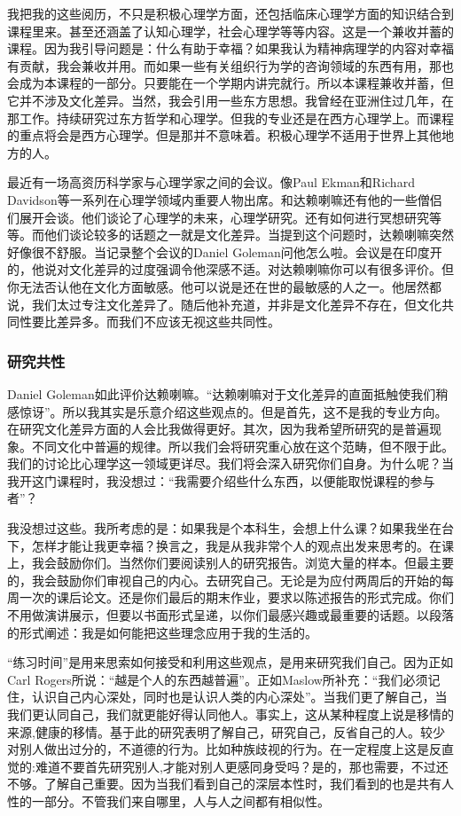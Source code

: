 我把我的这些阅历，不只是积极心理学方面，还包括临床心理学方面的知识结合到课程里来。甚至还涵盖了认知心理学，社会心理学等等内容。这是一个兼收并蓄的课程。因为我引导问题是：什么有助于幸福？如果我认为精神病理学的内容对幸福有贡献，我会兼收并用。而如果一些有关组织行为学的咨询领域的东西有用，那也会成为本课程的一部分。只要能在一个学期内讲完就行。所以本课程兼收并蓄，但它并不涉及文化差异。当然，我会引用一些东方思想。我曾经在亚洲住过几年，在那工作。持续研究过东方哲学和心理学。但我的专业还是在西方心理学上。而课程的重点将会是西方心理学。但是那并不意味着。积极心理学不适用于世界上其他地方的人。

最近有一场高资历科学家与心理学家之间的会议。像Paul Ekman和Richard Davidson等一系列在心理学领域内重要人物出席。和达赖喇嘛还有他的一些僧侣们展开会谈。他们谈论了心理学的未来，心理学研究。还有如何进行冥想研究等等。而他们谈论较多的话题之一就是文化差异。当提到这个问题时，达赖喇嘛突然好像很不舒服。当记录整个会议的Daniel Goleman问他怎么啦。会议是在印度开的，他说对文化差异的过度强调令他深感不适。对达赖喇嘛你可以有很多评价。但你无法否认他在文化方面敏感。他可以说是还在世的最敏感的人之一。他居然都说，我们太过专注文化差异了。随后他补充道，并非是文化差异不存在，但文化共同性要比差异多。而我们不应该无视这些共同性。

\subsubsection{研究共性}
Daniel Goleman如此评价达赖喇嘛。“达赖喇嘛对于文化差异的直面抵触使我们稍感惊讶”。所以我其实是乐意介绍这些观点的。但是首先，这不是我的专业方向。在研究文化差异方面的人会比我做得更好。其次，因为我希望所研究的是普遍现象。不同文化中普遍的规律。所以我们会将研究重心放在这个范畴，但不限于此。我们的讨论比心理学这一领域更详尽。我们将会深入研究你们自身。为什么呢？当我开这门课程时，我没想过：“我需要介绍些什么东西，以便能取悦课程的参与者”？ 

我没想过这些。我所考虑的是：如果我是个本科生，会想上什么课？如果我坐在台下，怎样才能让我更幸福？换言之，我是从我非常个人的观点出发来思考的。在课上，我会鼓励你们。当然你们要阅读别人的研究报告。浏览大量的样本。但最主要的，我会鼓励你们审视自己的内心。去研究自己。无论是为应付两周后的开始的每周一次的课后论文。还是你们最后的期末作业，要求以陈述报告的形式完成。你们不用做演讲展示，但要以书面形式呈递，以你们最感兴趣或最重要的话题。以段落的形式阐述：我是如何能把这些理念应用于我的生活的。

“练习时间”是用来思索如何接受和利用这些观点，是用来研究我们自己。因为正如Carl Rogers所说：“越是个人的东西越普遍”。正如Maslow所补充：“我们必须记住，认识自己内心深处，同时也是认识人类的内心深处”。当我们更了解自己，当我们更认同自己，我们就更能好得认同他人。事实上，这从某种程度上说是移情的来源,健康的移情。基于此的研究表明了解自己，研究自己，反省自己的人。较少对别人做出过分的，不道德的行为。比如种族歧视的行为。在一定程度上这是反直觉的:难道不要首先研究别人,才能对别人更感同身受吗？是的，那也需要，不过还不够。了解自己重要。因为当我们看到自己的深层本性时，我们看到的也是共有人性的一部分。不管我们来自哪里，人与人之间都有相似性。 


